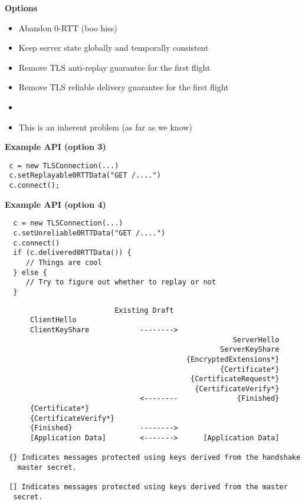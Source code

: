 \documentclass[helvetica]{seminar}
\newcommand{\heading}[1]{%
  \begin{center} 
    \large\bf 
    #1 
  \end{center} 
  \vspace{.4 in}}
\begin{document}
\begin{slide}
\heading{Options}

\begin{itemize}
\item Abandon 0-RTT (boo hiss)
\item Keep server state globally and temporally consistent
\item Remove TLS anti-replay guarantee for the first flight
\item Remove TLS reliable delivery guarantee for the first flight
\item[]
\item This is an inherent problem (as far as we know)
\end{itemize}

\end{slide}

\begin{slide}
\heading{Example API (option 3)}

\begin{verbatim}
 c = new TLSConnection(...)
 c.setReplayable0RTTData("GET /....")
 c.connect();
\end{verbatim}
\end{slide}


\begin{slide}
\heading{Example API (option 4)}

\begin{verbatim}
  c = new TLSConnection(...)
  c.setUnreliable0RTTData("GET /....")
  c.connect()
  if (c.delivered0RTTData()) {
     // Things are cool
  } else {
     // Try to figure out whether to replay or not
  }
\end{verbatim}
\end{slide}


\begin{slide}
\begin{footnotesize}
\begin{verbatim}
                          Existing Draft
      ClientHello
      ClientKeyShare            -------->
                                                      ServerHello
                                                   ServerKeyShare
                                           {EncryptedExtensions*}
                                                   {Certificate*}
                                            {CertificateRequest*}
                                             {CertificateVerify*}
                                <--------              {Finished}
      {Certificate*}
      {CertificateVerify*}
      {Finished}                -------->
      [Application Data]        <------->      [Application Data]

 {} Indicates messages protected using keys derived from the handshake
   master secret.

 [] Indicates messages protected using keys derived from the master
  secret.
\end{verbatim}
\end{footnotesize}
\end{slide}
\end{document}
